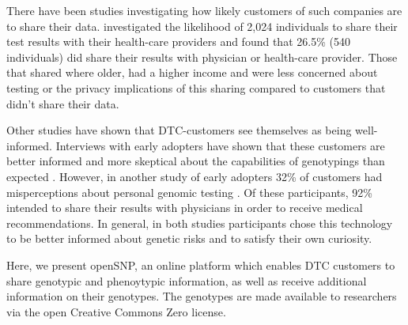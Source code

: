 \documentclass[10pt]{article}
\begin{document}
There have been studies investigating how likely customers of such companies are to share their data. \cite{Darst2013} investigated the likelihood of 2,024 individuals to share their test results with their health-care providers and found that 26.5\% (540 individuals) did share their results with physician or health-care provider. Those that shared where older, had a higher income and were less concerned about testing or the privacy implications of this sharing compared to customers that didn't share their data.

Other studies have shown that DTC-customers see themselves as being well-informed. Interviews with early adopters have shown that these customers are better informed and more skeptical about the capabilities of genotypings than expected \cite{McGowan2010}. However, in another study of early adopters 32\% of customers had misperceptions about personal genomic testing \cite{Gollust2012}. Of these participants, 92\% intended to share their results with physicians in order to receive medical recommendations. In general, in both studies participants chose this technology to be better informed about genetic risks and to satisfy their own curiosity. 

Here, we present 
openSNP, an online platform which enables DTC customers to share genotypic and phenoytypic information, as well as receive additional information on their genotypes. The genotypes are made available to researchers via the open Creative Commons Zero license.

\end{document}
